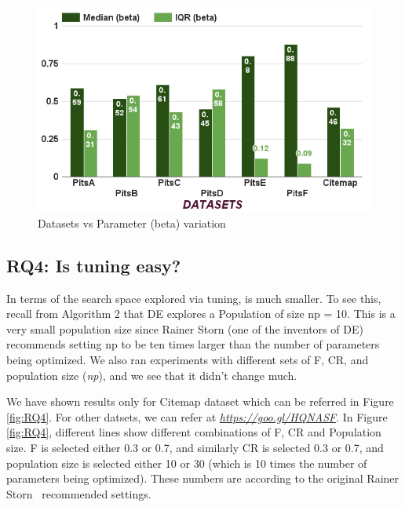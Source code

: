 \documentclass[conference]{IEEEtran}
\theoremstyle{break}
\begin{document}
\begin{center}
\begin{figure}[!h]
  \includegraphics[width=\linewidth]{./fig/Parameters_variation_b.png}
  \caption{Datasets vs Parameter (beta) variation}
  \label{RQ3:b}
\end{figure}
\end{center}

\subsection{\textbf{RQ4: Is  tuning  easy?}}

In terms of the search space explored via tuning, is much smaller. To see this, recall from Algorithm 2 that DE explores a Population of size np = 10. This is a very small population size since Rainer Storn (one of the inventors of DE) recommends setting np to be ten times larger than the number of parameters being optimized. We also ran experiments with different sets of F, CR, and population size (\textit{np}), and we see that it didn't change much.

We have shown results only for Citemap dataset which can be referred in Figure \ref{fig:RQ4}. For other datsets, we can refer at \href{https://goo.gl/HQNASF}{\textit{https://goo.gl/HQNASF}}. In Figure \ref{fig:RQ4}, different lines show different combinations of F, CR and Population size. F is selected either 0.3 or 0.7, and similarly CR is selected 0.3 or 0.7, and population size is selected either 10 or 30 (which is 10 times the number of parameters being optimized). These numbers are according to the original Rainer Storn~\cite{storn1997differential} recommended settings.
\end{document}
